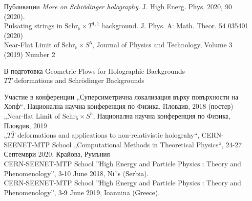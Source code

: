 \documentclass[bulg]{beamer}
\begin{document}
\begin{frame}
  \footnotesize
  \begin{alertblock}{\small{Публикации}}
  \textit{More on Schrödinger holography}. J. High Energ. Phys. 2020, 90
  (2020).\\

  Pulsating strings in $\text{Schr}_5\times T^{1,1}$ background. J. Phys. A:
  Math. Theor. 54 035401 (2020)\\

  Near-Flat Limit of $\text{Schr}_5 \times S^5$,
  Journal of Physics and Technology, Volume 3 (2019) Number 2
\end{alertblock}

\begin{exampleblock}{\small{В подготовка}}
    Geometric Flows for Holographic Backgrounds\\

    $T\overline{T}$ deformations and Schrödinger Backgrounds
  \end{exampleblock}
\end{frame}
\begin{frame}
  \begin{alertblock}{\small{Участие в конференции}}
  \footnotesize
    „Суперсиметрична локализация върху повърхности на Хопф“, Национална научна
    конференция по Физика, Пловдив, 2018 (постер)\\[15pt]
    „Near-flat Limit of $\text{Schr}_5\times S^5$, Национална научна
    конференция по Физика, Пловдив, 2019\\[15pt]
    „$T\overline{T}$ deformations and applications to non-relativistic holograhy“, 
    CERN-SEENET-MTP School „Computational Methods in Theoretical Physics“,
    24-27 Септември 2020, Крайова, Румъния\\[15pt]
    CERN-SEENET-MTP School ”High Energy and Particle Physics : Theory and
    Phenomenology”, 3-10 June 2018, Niˇs (Serbia).\\[15pt]
    CERN-SEENET-MTP School ”High Energy and Particle Physics : Theory and
    Phenomenology”, 3-9 June 2019, Ioannina (Greece).
  \end{alertblock}
\end{frame}

\end{document}
